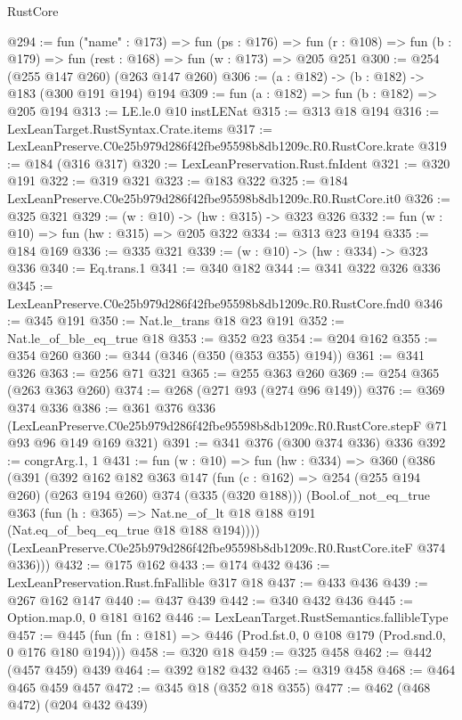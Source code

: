 \begin{lexlean}{RustCore}
\begin{coremodule}
@294 := fun ("name" : @173) =>
  fun (ps : @176) =>
  fun (r : @108) => fun (b : @179) => fun (rest : @168) => fun (w : @173) => @205 @251
@300 := @254 (@255 @147 @260) (@263 @147 @260)
@306 := (a : @182) -> (b : @182) -> @183 (@300 @191 @194) @194
@309 := fun (a : @182) => fun (b : @182) => @205 @194
@313 := LE.le.{0} @10 instLENat
@315 := @313 @18 @194
@316 := LexLeanTarget.RustSyntax.Crate.items
@317 := LexLeanPreserve.C0e25b979d286f42fbe95598b8db1209c.R0.RustCore.krate
@319 := @184 (@316 @317)
@320 := LexLeanPreservation.Rust.fnIdent
@321 := @320 @191
@322 := @319 @321
@323 := @183 @322
@325 := @184 LexLeanPreserve.C0e25b979d286f42fbe95598b8db1209c.R0.RustCore.it0
@326 := @325 @321
@329 := (w : @10) -> (hw : @315) -> @323 @326
@332 := fun (w : @10) => fun (hw : @315) => @205 @322
@334 := @313 @23 @194
@335 := @184 @169
@336 := @335 @321
@339 := (w : @10) -> (hw : @334) -> @323 @336
@340 := Eq.trans.{1}
@341 := @340 @182
@344 := @341 @322 @326 @336
@345 := LexLeanPreserve.C0e25b979d286f42fbe95598b8db1209c.R0.RustCore.fnd0
@346 := @345 @191
@350 := Nat.le_trans @18 @23 @191
@352 := Nat.le_of_ble_eq_true @18
@353 := @352 @23
@354 := @204 @162
@355 := @354 @260
@360 := @344 (@346 (@350 (@353 @355) @194))
@361 := @341 @326
@363 := @256 @71 @321
@365 := @255 @363 @260
@369 := @254 @365 (@263 @363 @260)
@374 := @268 (@271 @93 (@274 @96 @149))
@376 := @369 @374 @336
@386 := @361
    @376
    @336
    (LexLeanPreserve.C0e25b979d286f42fbe95598b8db1209c.R0.RustCore.stepF @71 @93 @96 @149 @169 @321)
@391 := @341 @376 (@300 @374 @336) @336
@392 := congrArg.{1, 1}
@431 := fun (w : @10) =>
  fun (hw : @334) =>
  @360
    (@386
      (@391
        (@392
          @162
          @182
          @363
          @147
          (fun (c : @162) => @254 (@255 @194 @260) (@263 @194 @260) @374 (@335 (@320 @188)))
          (Bool.of_not_eq_true
            @363
            (fun (h : @365) => Nat.ne_of_lt @18 @188 @191 (Nat.eq_of_beq_eq_true @18 @188 @194))))
        (LexLeanPreserve.C0e25b979d286f42fbe95598b8db1209c.R0.RustCore.iteF @374 @336)))
@432 := @175 @162
@433 := @174 @432
@436 := LexLeanPreservation.Rust.fnFallible @317 @18
@437 := @433 @436
@439 := @267 @162 @147
@440 := @437 @439
@442 := @340 @432 @436
@445 := Option.map.{0, 0} @181 @162
@446 := LexLeanTarget.RustSemantics.fallibleType
@457 := @445 (fun (fn : @181) => @446 (Prod.fst.{0, 0} @108 @179 (Prod.snd.{0, 0} @176 @180 @194)))
@458 := @320 @18
@459 := @325 @458
@462 := @442 (@457 @459) @439
@464 := @392 @182 @432
@465 := @319 @458
@468 := @464 @465 @459 @457
@472 := @345 @18 (@352 @18 @355)
@477 := @462 (@468 @472) (@204 @432 @439)

\end{coremodule}
\end{lexlean}
